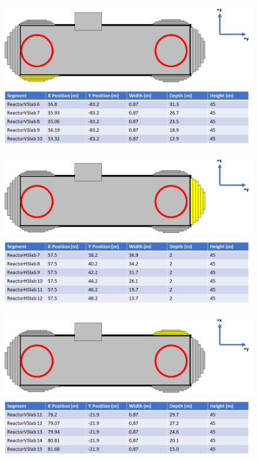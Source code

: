 \begin{figure}[htbp]
 \centering
 \includegraphics[width=\linewidth]{Chapter5/Figs/wylfaRasterNew/Slabs4.png}
 \label{fig:slabs4}
\end{figure}

\begin{figure}[htbp]
 \centering
 \includegraphics[width=\linewidth]{Chapter5/Figs/wylfaRasterNew/Slabs2.png}
 \label{fig:slabs2}
\end{figure}

\begin{figure}[htbp]
 \centering
 \includegraphics[width=\linewidth]{Chapter5/Figs/wylfaRasterNew/Slabs5.png}
 \label{fig:slabs5}
\end{figure}

